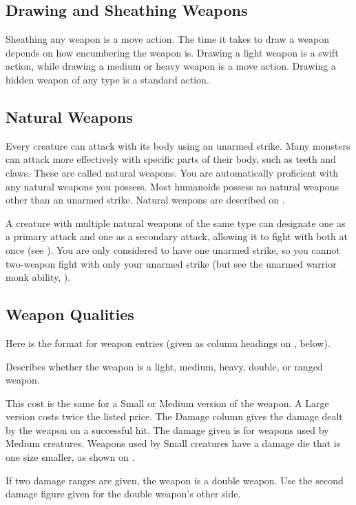 \subsection{Drawing and Sheathing Weapons}\label{Drawing and Sheathing Weapons}
Sheathing any weapon is a move action. The time it takes to draw a weapon depends on how encumbering the weapon is. Drawing a light weapon is a swift action, while drawing a medium or heavy weapon is a move action. Drawing a hidden weapon of any type is a standard action. 

\subsection{Natural Weapons}\label{Natural Weapons}
Every creature can attack with its body using an unarmed strike. Many monsters can attack more effectively with specific parts of their body, such as teeth and claws. These are called natural weapons. You are automatically proficient with any natural weapons you possess. Most humanoids possess no natural weapons other than an unarmed strike. Natural weapons are described on .

A creature with multiple natural weapons of the same type can designate one as a primary attack and one as a secondary attack, allowing it to fight with both at once (see ). You are only considered to have one unarmed strike, so you cannot two-weapon fight with only your unarmed strike (but see the unarmed warrior monk ability, ).

\subsection{Weapon Qualities}
Here is the format for weapon entries (given as column headings on , below).

 Describes whether the weapon is a light, medium, heavy, double, or ranged weapon.

\par This cost is the same for a Small or Medium version of the weapon. A Large version costs twice the listed price.
 The Damage column gives the damage dealt by the weapon on a successful hit. The damage given is for weapons used by Medium creatures. Weapons used by Small creatures have a damage die that is one size smaller, as shown on .

If two damage ranges are given, the weapon is a double weapon. Use the second damage figure given for the double weapon's other side.

